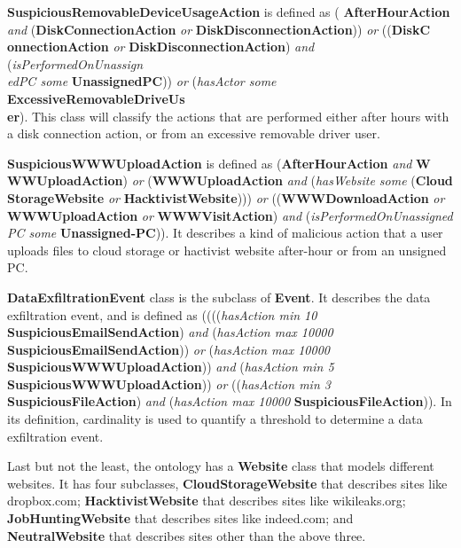 \textbf{SuspiciousRemovableDeviceUsageAction} is defined as ( \textbf{AfterHourAction} \textit{and} (\textbf{DiskConnectionAction} \textit{or} \textbf{DiskDisconnectionAction})) \textit{or} ((\textbf{DiskC\\onnectionAction} \textit{or} \textbf{DiskDisconnectionAction}) \textit{and} (\textit{isPerformedOnUnassign\\edPC some} \textbf{UnassignedPC})) \textit{or} (\textit{hasActor some} \textbf{ExcessiveRemovableDriveUs\\er}).
This class will classify the actions that are performed either after hours with a disk connection action, or from an excessive removable driver user. 

\textbf{SuspiciousWWWUploadAction} is defined as (\textbf{AfterHourAction} \textit{and} \textbf{W\\WWUploadAction}) \textit{or} (\textbf{WWWUploadAction} \textit{and} (\textit{hasWebsite some} (\textbf{Cloud\\StorageWebsite} \textit{or} \textbf{HacktivistWebsite}))) \textit{or} ((\textbf{WWWDownloadAction} \textit{or} \textbf{WWWUploadAction} \textit{or} \textbf{WWWVisitAction}) \textit{and} (\textit{isPerformedOnUnassigned\\PC some} \textbf{Unassigned-PC})).
It describes a kind of malicious action that a user uploads files to cloud storage or hactivist website after-hour or from an unsigned PC.

\textbf{DataExfiltrationEvent} class is the subclass of \textbf{Event}. 
It describes the data exfiltration event, and is defined as ((((\textit{hasAction min 10} \textbf{SuspiciousEmailSendAction}) \textit{and} (\textit{hasAction max 10000} \textbf{SuspiciousEmailSendAction})) \textit{or} (\textit{hasAction max 10000} \textbf{SuspiciousWWWUploadAction})) \textit{and} (\textit{hasAction min 5} \textbf{SuspiciousWWWUploadAction})) \textit{or} ((\textit{hasAction min 3} \textbf{SuspiciousFileAction}) \textit{and} (\textit{hasAction max 10000} \textbf{SuspiciousFileAction})).
In its definition, cardinality is used to quantify a threshold to determine a data exfiltration event.

Last but not the least, the ontology has a \textbf{Website} class that models different websites. 
It has four subclasses, \textbf{CloudStorageWebsite} that describes sites like dropbox.com; 
\textbf{HacktivistWebsite} that describes sites like wikileaks.org;
\textbf{JobHuntingWebsite} that describes sites like indeed.com;
and \textbf{NeutralWebsite} that describes sites other than the above three. 

